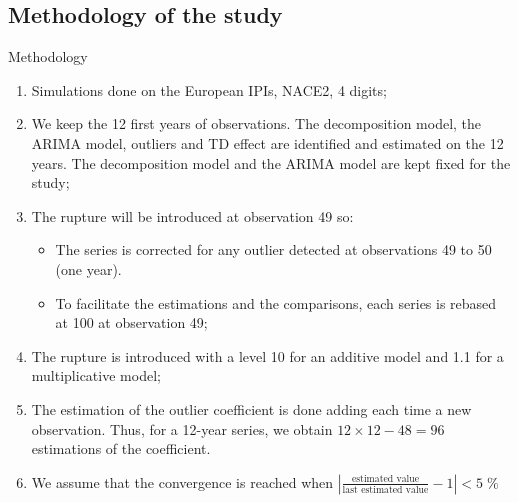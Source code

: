 \documentclass[10pt]{beamer}
\begin{document}
\subsection{Methodology of the study}
\begin{frame}{Methodology}

\begin{enumerate}
	\item Simulations done on the European IPIs, NACE2, 4 digits;
	\item We keep the 12 first years of observations. The decomposition model, the ARIMA model, outliers and TD effect are identified and estimated on the 12 years. The decomposition model and the ARIMA model are kept fixed for the study;
	\item The rupture will be introduced at observation 49 so:
	\begin{itemize}
	  \item The series is corrected for any outlier detected at observations 49 to 50 (one year).
	  \item To facilitate the estimations and the comparisons, each series is rebased at 100 at observation 49;
	\end{itemize}
	\item The rupture is introduced with a level 10 for an additive model and 1.1 for a multiplicative model;
	\item The estimation of the outlier coefficient is done adding each time a new observation. Thus, for a 12-year series, we obtain $12 \times 12 - 48 = 96$ estimations of the coefficient.
	\item We assume that the convergence is reached when $\left\lvert\frac{\text{estimated value}}{\text{last estimated value}}-1\right\rvert < 5\;\%$
\end{enumerate}
\end{frame}
\end{document}
